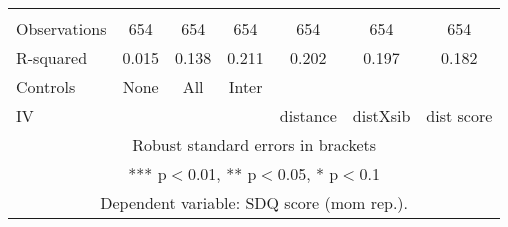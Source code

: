 \begin{tabular}{lcccccc}
 &  &  &  &  &  &  \\
Observations & 654 & 654 & 654 & 654 & 654 & 654 \\
R-squared & 0.015 & 0.138 & 0.211 & 0.202 & 0.197 & 0.182 \\
Controls & None & All & Inter &  &  &  \\
 IV &  &  &  & distance & distXsib & dist score \\ \hline
\multicolumn{7}{c}{ Robust standard errors in brackets} \\
\multicolumn{7}{c}{ *** p$<$0.01, ** p$<$0.05, * p$<$0.1} \\
\multicolumn{7}{c}{ Dependent variable: SDQ score (mom rep.).} \\
\end{tabular}
